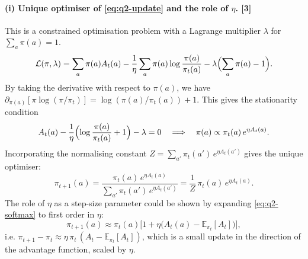 \documentclass[11pt,a4paper]{article}
\begin{document}
\paragraph{(i) Unique optimiser of \eqref{eq:q2-update} and the role of $\eta$. \hfill\textnormal{[3]}}
This is a constrained optimisation problem with a Lagrange multiplier $\lambda$ for $\sum_a\pi(a)=1$.
\begin{equation}
  \mathcal{L}(\pi,\lambda)=\sum_a\pi(a)A_t(a)-\frac1\eta\sum_a\pi(a)\log\frac{\pi(a)}{\pi_t(a)}
  -\lambda\Bigl(\sum_a\pi(a)-1\Bigr).
  \label{eq:q2-lagrangian}
\end{equation}
By taking the derivative with respect to $\pi(a)$, we have $\partial_{\pi(a)}[\pi\log(\pi/\pi_t)]=\log(\pi(a)/\pi_t(a))+1$.
This gives the stationarity condition
\begin{equation}
  A_t(a)-\frac1\eta\Bigl(\log\frac{\pi(a)}{\pi_t(a)}+1\Bigr)-\lambda=0
  \quad\Longrightarrow\quad
  \pi(a)\propto\pi_t(a)\,e^{\eta A_t(a)}.
  \label{eq:q2-stationarity}
\end{equation}
Incorporating the normalising constant $Z=\sum_{a'}\pi_t(a')\,e^{\eta A_t(a')}$ gives the unique optimiser:
\begin{equation}
  \pi_{t+1}(a)=\frac{\pi_t(a)\,e^{\eta A_t(a)}}{\sum_{a'}\pi_t(a')\,e^{\eta A_t(a')}}
  =\frac1Z\,\pi_t(a)\,e^{\eta A_t(a)}.
  \label{eq:q2-softmax}
\end{equation}
The role of $\eta$ as a step-size parameter could be shown by expanding \eqref{eq:q2-softmax} to first order in $\eta$:
\[
  \pi_{t+1}(a)\approx\pi_t(a)\bigl[1+\eta\bigl(A_t(a)-\mathbb{E}_{\pi_t}[A_t]\bigr)\bigr],
\]
i.e. $\pi_{t+1}-\pi_t \approx \eta\,\pi_t\,(A_t-\mathbb{E}_{\pi_t}[A_t])$, which is a small update in the direction of the advantage function, scaled by $\eta$.
\end{document}
